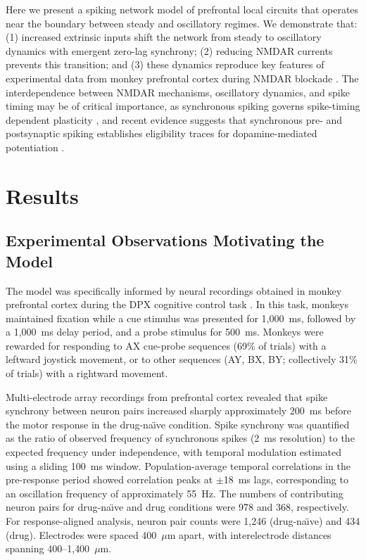 \documentclass[10pt]{article}
\begin{document}
Here we present a spiking network model of prefrontal local circuits that operates near the boundary between steady and oscillatory regimes. We demonstrate that: (1) increased extrinsic inputs shift the network from steady to oscillatory dynamics with emergent zero-lag synchrony; (2) reducing NMDAR currents prevents this transition; and (3) these dynamics reproduce key features of experimental data from monkey prefrontal cortex during NMDAR blockade \citep{zick2018blocking}. The interdependence between NMDAR mechanisms, oscillatory dynamics, and spike timing may be of critical importance, as synchronous spiking governs spike-timing dependent plasticity \citep{dan2004spike}, and recent evidence suggests that synchronous pre- and postsynaptic spiking establishes eligibility traces for dopamine-mediated potentiation \citep{he2015eligibility, yagishita2014critical, kasai2021spine}.

\section{Results}

\subsection{Experimental Observations Motivating the Model}

The model was specifically informed by neural recordings obtained in monkey prefrontal cortex during the DPX cognitive control task \citep{zick2018blocking}. In this task, monkeys maintained fixation while a cue stimulus was presented for 1{,}000~ms, followed by a 1{,}000~ms delay period, and a probe stimulus for 500~ms. Monkeys were rewarded for responding to AX cue-probe sequences (69\% of trials) with a leftward joystick movement, or to other sequences (AY, BX, BY; collectively 31\% of trials) with a rightward movement.

Multi-electrode array recordings from prefrontal cortex revealed that spike synchrony between neuron pairs increased sharply approximately 200~ms before the motor response in the drug-na\"{\i}ve condition. Spike synchrony was quantified as the ratio of observed frequency of synchronous spikes (2~ms resolution) to the expected frequency under independence, with temporal modulation estimated using a sliding 100~ms window. Population-average temporal correlations in the pre-response period showed correlation peaks at $\pm$18~ms lags, corresponding to an oscillation frequency of approximately 55~Hz. The numbers of contributing neuron pairs for drug-na\"{\i}ve and drug conditions were 978 and 368, respectively. For response-aligned analysis, neuron pair counts were 1{,}246 (drug-na\"{\i}ve) and 434 (drug). Electrodes were spaced 400~$\mu$m apart, with interelectrode distances spanning 400--1{,}400~$\mu$m.
\end{document}
